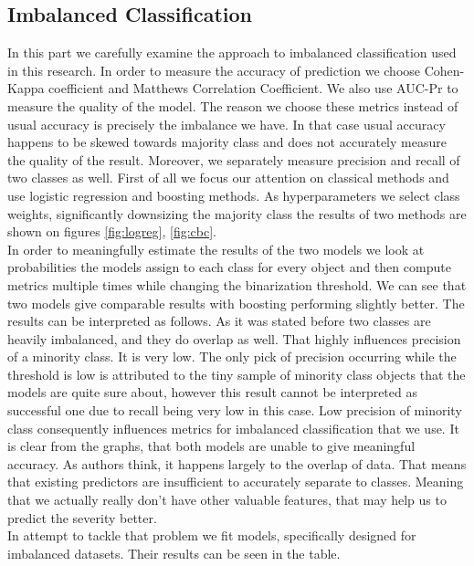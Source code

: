 \subsection{Imbalanced Classification}
In this part we carefully examine the approach to imbalanced classification used in this research.
In order to measure the accuracy of prediction we choose Cohen-Kappa coefficient and Matthews Correlation Coefficient.
We also use AUC-Pr to measure the quality of the model. The reason we choose these metrics instead of usual accuracy is precisely the imbalance we have.
In that case usual accuracy happens to be skewed towards majority class and does not accurately measure the quality of the result.
Moreover, we separately measure precision and recall of two classes as well.
First of all we focus our attention on classical methods and use logistic regression and boosting methods.
As hyperparameters we select class weights, significantly downsizing the majority class the results of two methods are shown on figures
\ref{fig:logreg}, \ref{fig:cbc}. \\
In order to meaningfully estimate the results of the two models we look at probabilities the models assign to each class
for every object and then compute metrics multiple times while changing the binarization threshold.
We can see that two models give comparable results with boosting performing slightly better. The results can be interpreted as follows.
As it was stated before two classes are heavily imbalanced, and they do overlap as well.
That highly influences precision of a minority class. It is very low.
The only pick of precision occurring while the threshold is low is attributed to the tiny sample of minority class objects
that the models are quite sure about, however this result cannot be interpreted as successful one due to recall being very low in this case. 
Low precision of minority class consequently influences metrics for imbalanced classification that we use. 
It is clear from the graphs, that both models are unable to give meaningful accuracy.
As authors think, it happens largely to the overlap of data.
That means that existing predictors are insufficient to accurately separate to classes.
Meaning that we actually really don’t have other valuable features, that may help us to predict the severity better. \\
In attempt to tackle that problem we fit models, specifically designed for imbalanced datasets.
Their results can be seen in the table.

